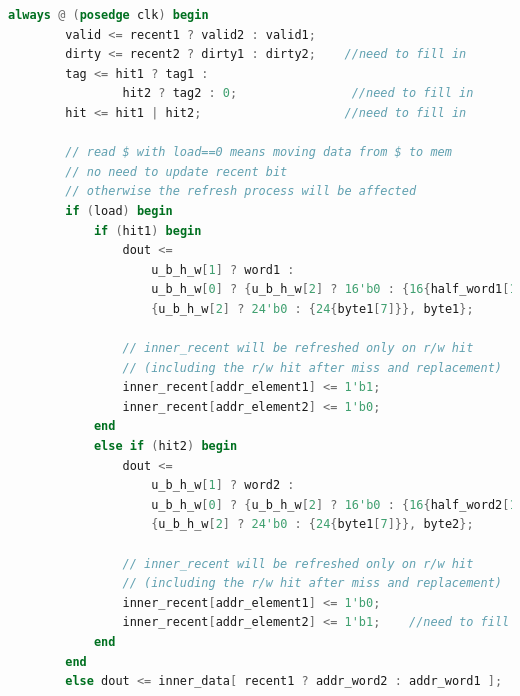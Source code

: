 \begin{lstlisting}[language = {verilog}]
    always @ (posedge clk) begin
        valid <= recent1 ? valid2 : valid1;
        dirty <= recent2 ? dirty1 : dirty2;    //need to fill in
        tag <= hit1 ? tag1 :
                hit2 ? tag2 : 0;                //need to fill in
        hit <= hit1 | hit2;                    //need to fill in
        
        // read $ with load==0 means moving data from $ to mem
        // no need to update recent bit
        // otherwise the refresh process will be affected
        if (load) begin
            if (hit1) begin
                dout <=
                    u_b_h_w[1] ? word1 :
                    u_b_h_w[0] ? {u_b_h_w[2] ? 16'b0 : {16{half_word1[15]}}, half_word1} :
                    {u_b_h_w[2] ? 24'b0 : {24{byte1[7]}}, byte1};
                
                // inner_recent will be refreshed only on r/w hit
                // (including the r/w hit after miss and replacement)
                inner_recent[addr_element1] <= 1'b1;
                inner_recent[addr_element2] <= 1'b0;
            end
            else if (hit2) begin
                dout <=
                    u_b_h_w[1] ? word2 :
                    u_b_h_w[0] ? {u_b_h_w[2] ? 16'b0 : {16{half_word2[15]}}, half_word2} :
                    {u_b_h_w[2] ? 24'b0 : {24{byte1[7]}}, byte2};
                
                // inner_recent will be refreshed only on r/w hit
                // (including the r/w hit after miss and replacement)
                inner_recent[addr_element1] <= 1'b0;
                inner_recent[addr_element2] <= 1'b1;    //need to fill in
            end
        end
        else dout <= inner_data[ recent1 ? addr_word2 : addr_word1 ];


\end{lstlisting}
